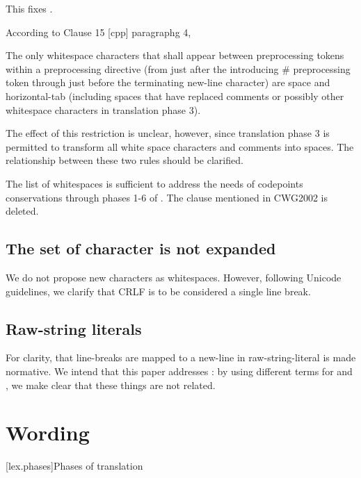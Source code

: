 \documentclass{wg21}
\begin{document}
This fixes .

\begin{quoteblock}
According to Clause 15 [cpp] paragraphg 4,

\begin{quoteblock}
The only whitespace characters that shall appear between preprocessing tokens within a preprocessing directive (from just after the introducing \# preprocessing token through just before the terminating new-line character) are space and horizontal-tab (including spaces that have replaced comments or possibly other whitespace characters in translation phase 3).
\end{quoteblock}
The effect of this restriction is unclear, however, since translation phase 3 is permitted to transform all white space characters and comments into spaces. The relationship between these two rules should be clarified.
\end{quoteblock}

The list of whitespaces is sufficient to address the needs of
codepoints conservations through phases 1-6 of .
The clause mentioned in CWG2002 is deleted.

\subsection{The set of character is not expanded}

We do not propose new characters as whitespaces.
However, following Unicode guidelines, we clarify that CRLF is to be considered a single line break.

\subsection{Raw-string literals}

For clarity, that line-breaks are mapped to a new-line in raw-string-literal is made normative.
We intend that this paper addresses : by using different terms for  and , we make clear that these things are not related.

\section{Wording}
[lex.phases]{Phases of translation}%

\end{document}
